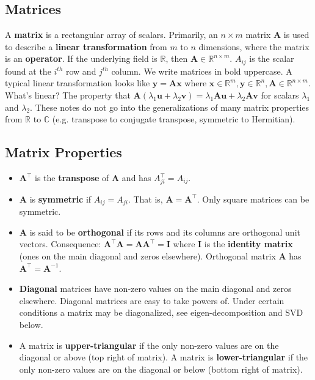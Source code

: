 \documentclass{harvardml}
\theoremstyle{definition}
\theoremstyle{plain}
\newcommand{\R}{\mathbb{R}}
\newcommand{\C}{\mathbb{C}}
\begin{document}
    \subsection{Matrices}
		A \textbf{matrix} is a rectangular array of scalars.
		Primarily, an $n \times m$ matrix $\mathbf{A}$ is used to 
		describe a \textbf{linear transformation} from $m$ to $n$ 
		dimensions, where the matrix is an \textbf{operator}. If the 
		underlying field is $\R$, then $\mathbf{A} \in \R^{n \times m}$. 
		$A_{ij}$ is the scalar found at the $i^{th}$ row and $j^{th}$
		column. We write matrices in bold uppercase.
        A typical linear transformation looks like
            $\mathbf{y} = \mathbf{Ax}$ where $\mathbf{x} \in \R^m,
               \mathbf{y} \in \R^n, \mathbf{A} \in \R^{n \times m}$.
            What's linear? The property that $\mathbf{A}(\lambda_1\mathbf{u} 
			+ \lambda_2\mathbf{v}) = \lambda_1\mathbf{Au} +
            \lambda_2\mathbf{Av}$ for scalars $\lambda_1$ and $\lambda_2$.
			These notes do not go into the generalizations
			of many matrix properties from $\R$ to $\C$ 
			(e.g. transpose to conjugate transpose, symmetric to Hermitian).
    \subsection{Matrix Properties}
        \begin{itemize}
            \item $\mathbf{A}^\top$ is the \textbf{transpose} of
				  $\mathbf{A}$ and has $A^\top_{ji} = A_{ij}$.
            \item $\mathbf{A}$ is \textbf{symmetric} if 
				  $A_{ij} = A_{ji}$. That is, $\mathbf{A} = \mathbf{A}^\top$.
                  Only square matrices can be symmetric.
            \item $\mathbf{A}$ is said to be \textbf{orthogonal}
                  if its rows and its columns are orthogonal unit vectors.
                  Consequence: $\mathbf{A}^\top\mathbf{A} = 
							   \mathbf{A}\mathbf{A}^\top = \mathbf{I}$
				  where $\mathbf{I}$ is the \textbf{identity matrix}
				  (ones on the main diagonal and zeros elsewhere).
				  Orthogonal matrix $\mathbf{A}$
				  has $\mathbf{A}^\top = \mathbf{A}^{-1}$.
            \item \textbf{Diagonal} matrices have non-zero values on the main
                  diagonal and zeros elsewhere. Diagonal matrices are easy to 
                  take powers of. Under certain conditions a matrix may be 
                  diagonalized, see eigen-decomposition and SVD below.

            \item A matrix is \textbf{upper-triangular} if the only non-zero
                  values are on the diagonal or above (top right of matrix).
                  A matrix is \textbf{lower-triangular} if the only non-zero
                  values are on the diagonal or below (bottom right of matrix).

            \end{itemize}
\end{document}

